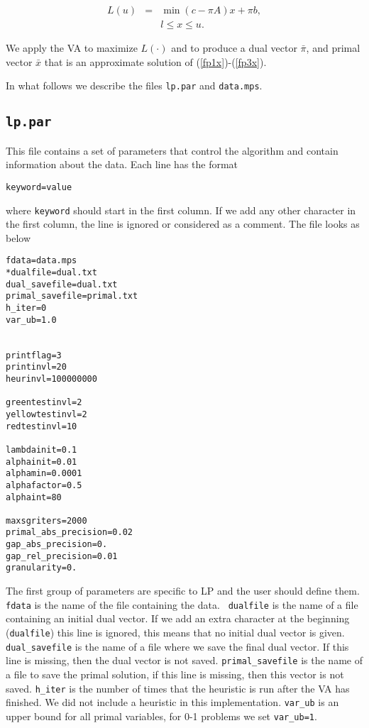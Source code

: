 \documentclass{article}
\begin{document}
\begin{eqnarray*}
L(u) & = & \min (c-\pi A) x + \pi b, \\
&&l \leq x \le u.
\end{eqnarray*}

We apply the VA to maximize $L(\cdot)$ and to produce a
dual vector $\bar \pi$, and
primal vector $\bar x$ that is an approximate solution of
(\ref{fp1x})-(\ref{fp3x}).

In what follows we describe the files {\tt lp.par} and
{\tt data.mps}.


\subsection{{\tt lp.par}}

This file contains a set of parameters that control the algorithm and contain
information about the data. Each line has the format

{\tt keyword=value}

\noindent where {\tt keyword} should start in the first column. If we add any
other character in the first column, the line is ignored or considered as a
comment. The file looks as below

\bigskip
\begin{verbatim}
fdata=data.mps
*dualfile=dual.txt
dual_savefile=dual.txt
primal_savefile=primal.txt
h_iter=0
var_ub=1.0


printflag=3
printinvl=20
heurinvl=100000000

greentestinvl=2
yellowtestinvl=2
redtestinvl=10

lambdainit=0.1
alphainit=0.01
alphamin=0.0001
alphafactor=0.5
alphaint=80

maxsgriters=2000
primal_abs_precision=0.02
gap_abs_precision=0.
gap_rel_precision=0.01
granularity=0.

\end{verbatim}

The first group of parameters are specific to LP and the user should
define them. {\tt fdata} is the name of the file containing the data. {\tt
dualfile} is the name of a file containing an initial dual vector. If we add
an extra character at the beginning ({\tt *dualfile}) this line is ignored,
this means that no initial dual vector is given. {\tt dual\_savefile} is the
name of a file where we save the final dual vector. If this line is missing,
then the dual vector is not saved. {\tt primal\_savefile} is the name of a file
to save the primal solution, if this
line is missing, then this vector is not saved. {\tt h\_iter} is the number of
times that the heuristic is run after the VA has finished. We did not include 
a heuristic in this implementation. {\tt var\_ub} is an upper bound
for all primal variables, for 0-1 problems we set {\tt var\_ub=1}.
\end{document}
